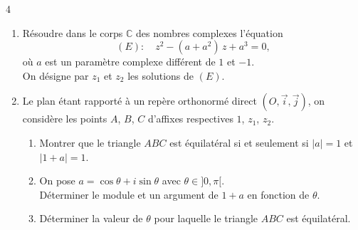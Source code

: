 \documentclass{axiobac}
\begin{document}
\entete

\begin{exercice}{4}

\begin{enumerate}
    \item Résoudre dans le corps $\mathbb{C}$ des nombres complexes l'équation
    \[
    (E) : \quad z^2 - (a + a^2)\,z + a^3 = 0,
    \]
    où $a$ est un paramètre complexe différent de $1$ et $-1$. \\
    On désigne par $z_1$ et $z_2$ les solutions de $(E)$.
    \item Le plan étant rapporté à un repère orthonormé direct $(O, \vec{i}, \vec{j})$, on considère les points $A$, $B$, $C$ d'affixes respectives $1$, $z_1$, $z_2$.
    \begin{enumerate}
        \item Montrer que le triangle $ABC$ est équilatéral si et seulement si $|a| = 1$ et $|1 + a| = 1$.
        \item On pose $a = \cos\theta + i\sin\theta$ avec $\theta \in ]0, \pi[$. \\
        Déterminer le module et un argument de $1 + a$ en fonction de $\theta$.
        \item Déterminer la valeur de $\theta$ pour laquelle le triangle $ABC$ est équilatéral.
    \end{enumerate}
\end{enumerate}

\end{exercice}
\end{document}
